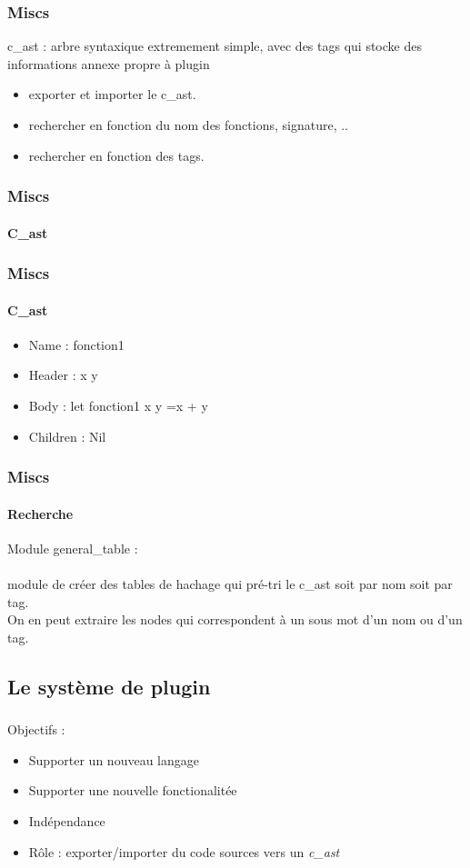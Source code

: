 \documentclass{beamer}
\begin{document}
\begin{frame}
    \frametitle{Miscs}

    c\_ast : arbre syntaxique extremement simple, avec des tags qui stocke des informations annexe propre à plugin
    \begin{itemize}
        \item exporter et importer le c\_ast.
        \item rechercher en fonction du nom des fonctions, signature, ..
        \item rechercher en fonction des tags.
    \end{itemize}
\end{frame}

\begin{frame}
    \frametitle{Miscs}
    \framesubtitle{C\_ast}

    
\end{frame}

\begin{frame}
    \frametitle{Miscs}
    \framesubtitle{C\_ast}

    
    \begin{itemize}
        \item Name : fonction1
        \item Header : x y
        \item Body : let fonction1 x y =x + y
        \item Children : Nil
    \end{itemize}
\end{frame}

\begin{frame}
    \frametitle{Miscs}
    \framesubtitle{Recherche}

    Module general\_table :\\ \ \\
    module de créer des tables de hachage qui pré-tri le c\_ast
    soit par nom soit par tag.\\
    On en peut extraire les nodes qui correspondent à un sous mot
    d'un nom ou d'un tag.
\end{frame}


\begin{frame}
\section{Le système de plugin}
\frametitle{}

 Objectifs :
\begin{itemize}
    \item Supporter un nouveau langage
    \item Supporter une nouvelle fonctionalitée
    \item Indépendance %
    \item Rôle : exporter/importer du code sources vers un \textit{c\_ast}
\end{itemize}

\end{frame}
\end{document}

